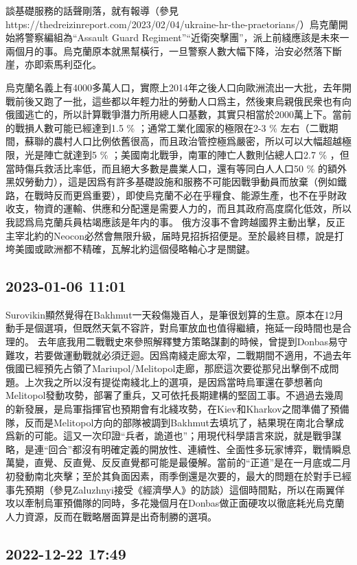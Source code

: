 \documentclass[twocolumn]{ctexart}
\begin{document}
談基礎服務的話聲剛落，就有報導（參見https://thedreizinreport.com/2023/02/04/ukraine-hr-the-praetorians/）烏克蘭開始將警察編組為“Assault Guard Regiment”“近衛突擊團”，派上前綫應該是未來一兩個月的事。烏克蘭原本就黑幫橫行，一旦警察人數大幅下降，治安必然落下斷崖，亦即索馬利亞化。

烏克蘭名義上有4000多萬人口，實際上2014年之後人口向歐洲流出一大批，去年開戰前後又跑了一批，這些都以年輕力壯的勞動人口爲主，然後東烏親俄民衆也有向俄國逃亡的，所以計算戰爭潛力所用總人口基數，其實只相當於2000萬上下。當前的戰損人數可能已經達到1.5 \% ；通常工業化國家的極限在2-3 \% 左右（二戰期間，蘇聯的農村人口比例依舊很高，而且政治管控極爲嚴密，所以可以大幅超越極限，光是陣亡就達到5 \% ；美國南北戰爭，南軍的陣亡人數則佔總人口2.7 \% ，但當時傷兵救活比率低，而且絕大多數是農業人口，還有等同白人人口50 \% 的額外黑奴勞動力），這是因爲有許多基礎設施和服務不可能因戰爭動員而放棄（例如鐵路，在戰時反而更爲重要），即使烏克蘭不必在乎糧食、能源生產，也不在乎財政收支，物資的運輸、供應和分配還是需要人力的，而且其政府高度腐化低效，所以我認爲烏克蘭兵員枯竭應該是年内的事。
俄方沒事不會跨越國界主動出擊，反正主宰北約的Neocon必然會無限升級，届時見招拆招便是。至於最終目標，說是打垮美國或歐洲都不精確，瓦解北約這個侵略軸心才是關鍵。
\subsection*{2023-01-06 11:01}

Surovikin顯然覺得在Bakhmut一天殺傷幾百人，是筆很划算的生意。原本在12月動手是個選項，但既然天氣不容許，對烏軍放血也值得繼續，拖延一段時間也是合理的。
去年底我用二戰戰史來參照解釋雙方策略謀劃的時候，曾提到Donbas易守難攻，若要做運動戰就必須迂迴。因爲南綫走廊太窄，二戰期間不適用，不過去年俄國已經預先占領了Mariupol/Melitopol走廊，那麽這次要從那兒出擊倒不成問題。上次我之所以沒有提從南綫北上的選項，是因爲當時烏軍還在夢想著向Melitopol發動攻勢，部署了重兵，又可依托長期建構的堅固工事。不過過去幾周的新發展，是烏軍指揮官也預期會有北綫攻勢，在Kiev和Kharkov之間準備了預備隊，反而是Melitopol方向的部隊被調到Bakhmut去填坑了，結果現在南北合擊成爲新的可能。這又一次印證“兵者，詭道也”；用現代科學語言來説，就是戰爭謀略，是連“回合”都沒有明確定義的開放性、連續性、全面性多玩家博弈，戰情瞬息萬變，直覺、反直覺、反反直覺都可能是最優解。當前的“正道”是在一月底或二月初發動南北夾擊；至於其負面因素，雨季倒還是次要的，最大的問題在於對手已經事先預期（參見Zaluzhnyi接受《經濟學人》的訪談）這個時間點，所以在兩翼佯攻以牽制烏軍預備隊的同時，多花幾個月在Donbas做正面硬攻以徹底耗光烏克蘭人力資源，反而在戰略層面算是出奇制勝的選項。
\subsection*{2022-12-22 17:49}
\end{document}
